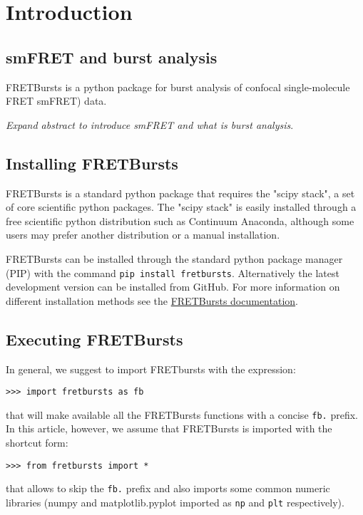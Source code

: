 \section{Introduction}

\subsection{smFRET and burst analysis}

FRETBursts is a python package for burst analysis of confocal single-molecule
FRET smFRET) data.

\textit{Expand abstract to introduce smFRET and what is burst analysis}.

\subsection{Installing FRETBursts}
FRETBursts is a standard python package that requires the "scipy stack", a set
of core 
scientific python packages.
The "scipy stack" is easily installed through a free scientific python
distribution such as Continuum Anaconda, although some users may prefer another
distribution or a manual installation.

FRETBursts can be installed through the standard python package manager (PIP)
with 
the command \texttt{pip install fretbursts}. Alternatively the latest
development version can be installed from GitHub.
For more information on different installation methods see the
\href{http://fretbursts.readthedocs.org/en/latest/installation.html}{FRETBursts
documentation}.

\subsection{Executing FRETBursts}
In general, we suggest to import FRETbursts with the expression:

\begin{verbatim}
>>> import fretbursts as fb
\end{verbatim}

that will make available all the FRETBursts functions with a concise \verb|fb.|
prefix. In this article, however, we assume that FRETBursts is imported with the
shortcut form:

\begin{verbatim}
>>> from fretbursts import *
\end{verbatim}

that allows to skip the \verb|fb.| prefix and also imports some common numeric
libraries (numpy and matplotlib.pyplot imported as \verb|np| and \verb|plt|
respectively).

